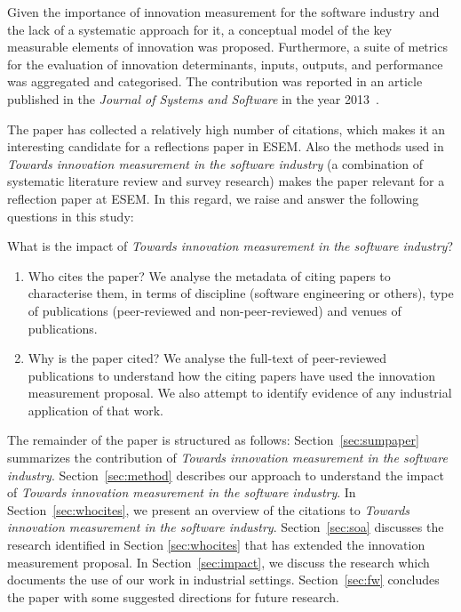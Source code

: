 \documentclass[sigconf,review]{acmart}
\newcommand{\theArticle}{\textit{Towards innovation measurement in the software industry}}
\begin{document}
Given the importance of innovation measurement for the software industry and the lack of a systematic approach for it, a conceptual model of the key measurable elements of innovation was proposed. Furthermore, a suite of metrics for the evaluation of innovation determinants, inputs, outputs, and performance was aggregated and categorised. The contribution was reported in an article published in the \textit{Journal of Systems and Software} in the year 2013~\cite{EdisonAT13}.

The paper has collected a relatively high number of citations, which makes it an interesting candidate for a reflections paper in ESEM. Also the methods used in \theArticle{} (a combination of systematic literature review and survey research) makes the paper relevant for a reflection paper at ESEM. In this regard, we raise and answer the following questions in this study:

What is the impact of \theArticle? 
\begin{enumerate}
    \item Who cites the paper? We analyse the metadata of citing papers to characterise them, in terms of discipline (software engineering or others), type of publications (peer-reviewed and non-peer-reviewed) and venues of publications.
    \item Why is the paper cited? We analyse the full-text of peer-reviewed publications to understand how the citing papers have used the innovation measurement proposal. We also attempt to identify evidence of any industrial application of that work.
\end{enumerate}

The remainder of the paper is structured as follows: Section~\ref{sec:sumpaper} summarizes the contribution of \theArticle. Section~\ref{sec:method} describes our approach to understand the impact of \theArticle. In Section~\ref{sec:whocites}, we present an overview of the citations to \theArticle. Section~\ref{sec:soa} discusses the research identified in Section \ref{sec:whocites} that has extended the innovation measurement proposal. In Section~\ref{sec:impact}, we discuss the research which documents the use of our work in industrial settings. Section~\ref{sec:fw} concludes the paper with some suggested directions for future research.
\end{document}
